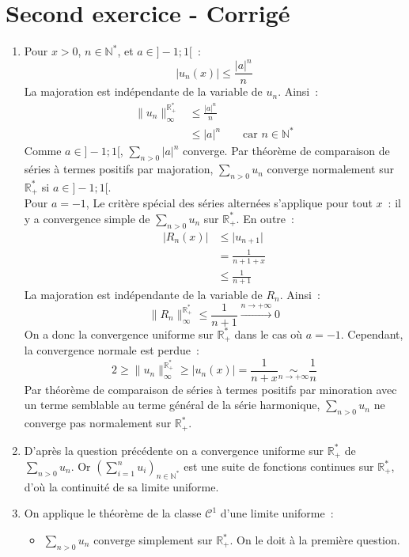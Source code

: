 \documentclass[11pt]{article}
\newcommand{\R}{\mathbb{R}}
\newcommand{\N}{\mathbb{N}}
\begin{document}
\section*{Second exercice - Corrigé}
\begin{enumerate}[label=\textbf{\arabic*.}]
    \item Pour $x > 0$, $n \in \N^*$, et $a \in ]-1;1[$~:
        $$\vert u_n(x) \vert \leq \frac{\vert a \vert^n}{n}$$
    La majoration est indépendante de la variable de $u_n$. Ainsi~:
    \begin{align*}
        \lVert u_n \rVert_\infty^{\R_+^*} &\leq \frac{\vert a \vert^n}{n}\\
        &\leq \vert a \vert^n \qquad \text{car $n \in \N^*$}
    \end{align*}
    Comme $a \in ]-1;1[$, $\sum_{n>0} \vert a \vert^n $ converge. Par théorème de comparaison de séries à termes positifs par majoration, $\sum_{n > 0}u_n$ converge normalement sur $\R_+^*$ si $a \in ]-1;1[$.\\
    Pour $a = -1$, Le critère spécial des séries alternées s'applique pour tout $x$~: il y a convergence simple de $\sum_{n > 0}u_n$ sur $\R_+^*$. En outre~:
    \begin{align*}
        \vert R_n(x)\vert &\leq \vert u_{n+1}\vert\\
        &=\frac{1}{n+1+x} \\
        &\leq \frac{1}{n+1}
    \end{align*}
    La majoration est indépendante de la variable de $R_n$. Ainsi~:
    $$\lVert R_n \rVert_\infty^{\R_+^*} \leq \frac{1}{n+1}\xrightarrow{n \to +\infty} 0$$
    On a donc la convergence uniforme sur $\R_+^*$ dans le cas où $a = -1$. Cependant, la convergence normale est perdue~:
    $$2 \geq \lVert u_n \rVert_\infty^{\R_+^*} \geq  \vert u_n(x) \vert = \frac{1}{n+x} \underset{n \to +\infty}{\sim} \frac{1}{n}$$
    Par théorème de comparaison de séries à termes positifs par minoration avec un terme semblable au terme général de la série harmonique, $\sum_{n > 0}u_n$ ne converge pas normalement sur $\R_+^*$.
    \item D'après la question précédente on a convergence uniforme sur $\R_+^*$ de $\sum_{n > 0}u_n$. Or $(\sum_{i=1}^{n}u_i)_{n \in \N^*}$ est une suite de fonctions continues sur $\R_+^*$, d'où la continuité de sa limite uniforme.
    \item On applique le théorème de la classe $\mathcal{C}^1$ d'une limite uniforme~:
    \begin{itemize}
        \item $\sum_{n>0}u_n$ converge simplement sur $\R_+^*$. On le doit à la première question.

\end{itemize}
\end{enumerate}
\end{document}
